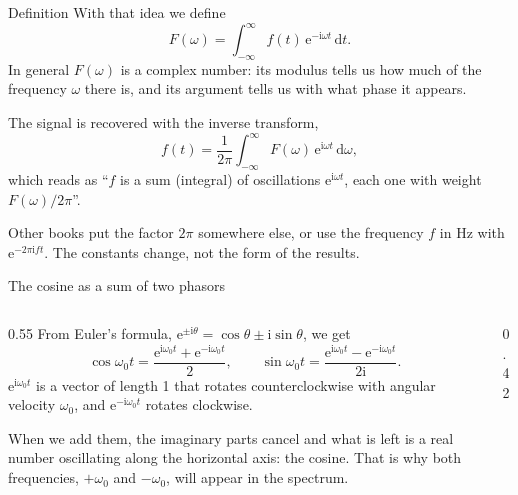 \documentclass[11pt,aspectratio=169]{beamer}
\newcommand{\dd}{\,\mathrm{d}}
\newcommand{\ii}{\mathrm{i}}
\newcommand{\e}{\mathrm{e}}
\begin{document}
\begin{frame}{Definition}
  With that idea we define
  \[
    F(\omega)=\int_{-\infty}^{\infty} f(t)\,\e^{-\ii\omega t}\dd t .
  \]
  In general $F(\omega)$ is a complex number: its modulus tells us how much of the
  frequency $\omega$ there is, and its argument tells us with what phase it appears.

  \vspace{3mm}
  The signal is recovered with the inverse transform,
  \[
    f(t)=\frac{1}{2\pi}\int_{-\infty}^{\infty} F(\omega)\,\e^{\ii\omega t}\dd\omega ,
  \]
  which reads as ``$f$ is a sum (integral) of oscillations $\e^{\ii\omega t}$, each one
  with weight $F(\omega)/2\pi$''.

  \vspace{3mm}
  {\small Other books put the factor $2\pi$ somewhere else, or use the frequency $f$ in Hz
  with $\e^{-2\pi\ii ft}$. The constants change, not the form of the results.}
\end{frame}

\begin{frame}{The cosine as a sum of two phasors}
  \begin{columns}[c]
    \begin{column}{0.55\textwidth}
      From Euler's formula, $\e^{\pm\ii\theta}=\cos\theta\pm\ii\sin\theta$, we get
      \[
        \cos\omega_0 t=\frac{\e^{\ii\omega_0 t}+\e^{-\ii\omega_0 t}}{2},\qquad
        \sin\omega_0 t=\frac{\e^{\ii\omega_0 t}-\e^{-\ii\omega_0 t}}{2\ii}.
      \]
      $\e^{\ii\omega_0 t}$ is a vector of length 1 that rotates counterclockwise with
      angular velocity $\omega_0$, and $\e^{-\ii\omega_0 t}$ rotates clockwise.

      \vspace{2mm}
      When we add them, the imaginary parts cancel and what is left is a real number
      oscillating along the horizontal axis: the cosine. That is why both frequencies,
      $+\omega_0$ and $-\omega_0$, will appear in the spectrum.
    \end{column}
    \begin{column}{0.42\textwidth}
      \centering
    \end{column}
  \end{columns}
\end{frame}
\end{document}
